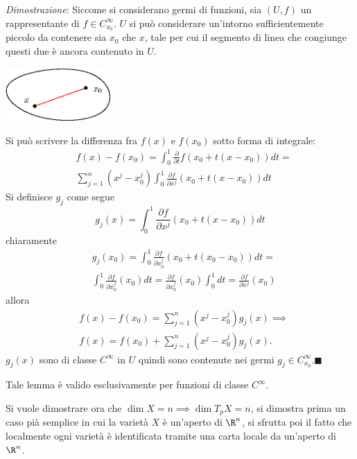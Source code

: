 \documentclass[10pt, letterpaper]{report}
\begin{document}
\noindent\textit{Dimostrazione}: Siccome si considerano germi di funzioni, sia $(U,f)$ un rappresentante di $f\in  C^\infty_ {x_0}$. $U$ si può considerare un'intorno sufficientemente piccolo da contenere sia $x_0$ che $x$, tale per cui il segmento di linea che congiunge questi due è ancora contenuto in $U$.\begin{center}
    \includegraphics[width=0.3\textwidth ]{images/insieme_stellato.eps}
\end{center}
Si può scrivere la differenza fra $f(x)$ e $f(x_0)$ sotto forma di integrale:\begin{align}
    &f(x)-f(x_0)=\int_0^1\frac{\partial}{\partial t}f(x_0+t(x-x_0))dt=\\
    &\sum_{j=1}^n(x^j-x_0^j)\int_0^1\frac{\partial f}{\partial x^j}(x_0+t(x-x_0))dt
\end{align}
Si definisce $g_j$ come segue\begin{equation}
    g_j(x)=\int_0^1\frac{\partial f}{\partial x^j}(x_0+t(x-x_0))dt
\end{equation}
chiaramente \begin{align}
     &g_j(x_0)=\int_0^1\frac{\partial f}{\partial x_0^j}(x_0+t(x_0-x_0))dt=\\
     &\int_0^1\frac{\partial f}{\partial x_0^j}(x_0)dt=
     \frac{\partial f}{\partial x_0^j}(x_0)\int_0^1dt
     =\frac{\partial f}{\partial x^j}(x_0)
\end{align}
allora \begin{align}
    &f(x)-f(x_0)=\sum_{j=1}^n(x^j-x_0^j)g_j(x)\implies\\
    &f(x)=f(x_0)+\sum_{j=1}^n(x^j-x_0^j)g_j(x).
\end{align}
$g_j(x)$ sono di classe $C^\infty$ in $U$ quindi sono contenute nei germi $g_j\in C_{x_0}^\infty$.\hfill$\blacksquare$
\begin{osservazione}
    Tale lemma è valido esclusivamente per funzioni di classe $C^\infty$.
\end{osservazione}
Si vuole dimostrare ora che $ \dim X=n\implies\dim T_pX=n$, si dimostra prima un caso pià semplice in cui la varietà $X$ è un'aperto di $\R^n$, si sfrutta poi il fatto che localmente ogni varietà è identificata tramite una carta locale da un'aperto di $\R^n$.
\end{document}
